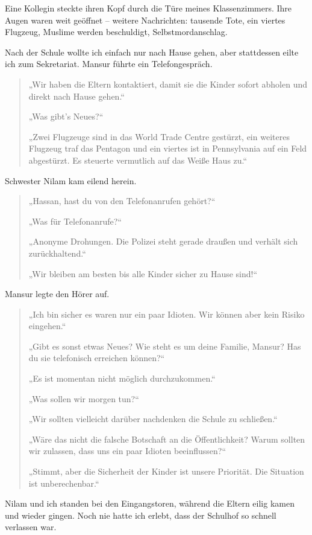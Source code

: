 \documentclass[12pt]{memoir}
\begin{document}
Eine Kollegin steckte ihren Kopf durch die Türe meines Klassenzimmers.
Ihre Augen waren weit geöffnet – weitere Nachrichten:
tausende Tote, ein viertes Flugzeug,
Muslime werden beschuldigt, Selbstmordanschlag.

Nach der Schule wollte ich einfach nur nach Hause gehen,
aber stattdessen eilte ich zum Sekretariat.
Mansur führte ein Telefongespräch.

\begin{quote}
„Wir haben die Eltern kontaktiert,
damit sie die Kinder sofort abholen und direkt nach Hause gehen.“

„Was gibt’s Neues?“

„Zwei Flugzeuge sind in das World Trade Centre gestürzt,
ein weiteres Flugzeug traf das Pentagon
und ein viertes ist in Pennsylvania auf ein Feld abgestürzt.
Es steuerte vermutlich auf das Weiße Haus zu.“
\end{quote}

Schwester Nilam kam eilend herein.

\begin{quote}
„Hassan, hast du von den Telefonanrufen gehört?“

„Was für Telefonanrufe?“

„Anonyme Drohungen.
Die Polizei steht gerade draußen und verhält sich zurückhaltend.“

„Wir bleiben am besten bis alle Kinder sicher zu Hause sind!“
\end{quote}

Mansur legte den Hörer auf.

\begin{quote}
„Ich bin sicher es waren nur ein paar Idioten.
Wir können aber kein Risiko eingehen.“

„Gibt es sonst etwas Neues?
Wie steht es um deine Familie, Mansur?
Has du sie telefonisch erreichen können?“

„Es ist momentan nicht möglich durchzukommen.“

„Was sollen wir morgen tun?“

„Wir sollten vielleicht darüber nachdenken die Schule zu schließen.“

„Wäre das nicht die falsche Botschaft an die Öffentlichkeit?
Warum sollten wir zulassen, dass uns ein paar Idioten beeinflussen?“

„Stimmt, aber die Sicherheit der Kinder ist unsere Priorität.
Die Situation ist unberechenbar.“
\end{quote}

Nilam und ich standen bei den Eingangstoren,
während die Eltern eilig kamen und wieder gingen.
Noch nie hatte ich erlebt, dass der Schulhof so schnell verlassen war.
\end{document}

